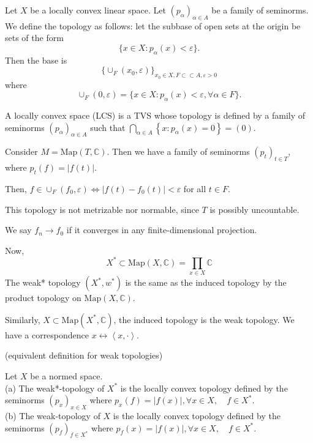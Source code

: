 
Let $X$ be a locally convex linear space. Let $(p_\alpha)_{\alpha \in A}$ be a family of seminorms. We define the topology as follows: let the subbase of open sets at the origin be sets of the form
\[
	\{x \in X: p_\alpha(x) < \varepsilon\} 
.\] 
Then the base is
\[
	\{\cup_F (x_0, \varepsilon)\} _{x_0 \in X, F \subset\subset A, \varepsilon > 0}
\] 
where
\[
	\cup_F(0,\varepsilon) = \{x \in X: p_\alpha(x) < \varepsilon, \forall \alpha \in F\} 
.\] 

\begin{definition}
	\label{defn:LocallyConvexSpace}
	A locally convex space (LCS) is a TVS whose topology is defined by a family of seminorms $\left(p_\alpha\right)_{\alpha \in A}$ such that $\bigcap_{\alpha \in A}\left\{x: p_\alpha(x)=0\right\}=(0)$.
\end{definition}

\begin{example}
	Consider $M = \text{Map}(T, \mathbb{C})$. Then we have a family of seminorms $(p_t)_{t \in T}$, where $p_t(f) = |f(t)|$.

	Then, $f \in \cup_F (f_0, \varepsilon) \iff \left| f(t) - f_0(t) \right| < \varepsilon$ for all $t \in F$.

	This topology is not metrizable nor normable, since $T$ is possibly uncountable.

We say $f_n \to f_0$ if it converges in any finite-dimensional projection.
\end{example}

Now,
\[
	X^* \subset \text{Map}(X, \mathbb{C}) = \prod_{x \in X} \mathbb{C}
\]
The weak* topology $(X^*, w^*)$ is the same as the induced topology by the product topology on $\text{Map}(X, \mathbb{C})$.


Similarly, $X \subset \text{Map}(X^*, \mathbb{C})$, the induced topology is the weak topology. We have a correspondence $x \leftrightarrow \left\langle x, \cdot  \right\rangle $.

\begin{proposition}(equivalent definition for weak topologies)

	\label{prop:WeakTopologyEquivalent}
	Let $X$ be a normed space.\\
(a) The weak*-topology of $X^*$ is the locally convex topology defined by the seminorms $\left(p_x\right)_{x \in X}$ where $p_x(f)=|f(x)|, \forall x \in X, \quad f \in X^*$.\\
(b) The weak-topology of $X$ is the locally convex topology defined by the seminorms $\left(p_f\right)_{f \in X^*}$ where $p_f(x)=|f(x)|, \forall x \in X, \quad f \in X^*$.
\end{proposition}

